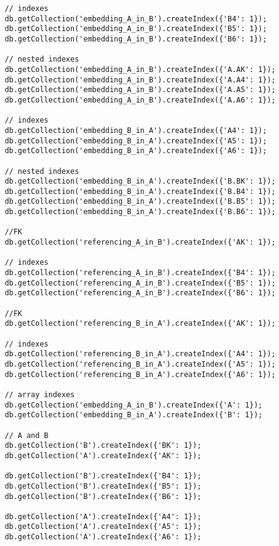 \begin{verbatim}
    // indexes
    db.getCollection('embedding_A_in_B').createIndex({'B4': 1});
    db.getCollection('embedding_A_in_B').createIndex({'B5': 1});
    db.getCollection('embedding_A_in_B').createIndex({'B6': 1});

    // nested indexes
    db.getCollection('embedding_A_in_B').createIndex({'A.AK': 1});
    db.getCollection('embedding_A_in_B').createIndex({'A.A4': 1});
    db.getCollection('embedding_A_in_B').createIndex({'A.A5': 1});
    db.getCollection('embedding_A_in_B').createIndex({'A.A6': 1});

    // indexes
    db.getCollection('embedding_B_in_A').createIndex({'A4': 1});
    db.getCollection('embedding_B_in_A').createIndex({'A5': 1});
    db.getCollection('embedding_B_in_A').createIndex({'A6': 1});

    // nested indexes
    db.getCollection('embedding_B_in_A').createIndex({'B.BK': 1});
    db.getCollection('embedding_B_in_A').createIndex({'B.B4': 1});
    db.getCollection('embedding_B_in_A').createIndex({'B.B5': 1});
    db.getCollection('embedding_B_in_A').createIndex({'B.B6': 1});

    //FK
    db.getCollection('referencing_A_in_B').createIndex({'AK': 1});               

    // indexes
    db.getCollection('referencing_A_in_B').createIndex({'B4': 1});
    db.getCollection('referencing_A_in_B').createIndex({'B5': 1});
    db.getCollection('referencing_A_in_B').createIndex({'B6': 1});

    //FK
    db.getCollection('referencing_B_in_A').createIndex({'AK': 1});               

    // indexes
    db.getCollection('referencing_B_in_A').createIndex({'A4': 1});
    db.getCollection('referencing_B_in_A').createIndex({'A5': 1});
    db.getCollection('referencing_B_in_A').createIndex({'A6': 1});

    // array indexes
    db.getCollection('embedding_A_in_B').createIndex({'A': 1});
    db.getCollection('embedding_B_in_A').createIndex({'B': 1});

    // A and B
    db.getCollection('B').createIndex({'BK': 1});
    db.getCollection('A').createIndex({'AK': 1});
    
    db.getCollection('B').createIndex({'B4': 1});
    db.getCollection('B').createIndex({'B5': 1});
    db.getCollection('B').createIndex({'B6': 1});
    
    db.getCollection('A').createIndex({'A4': 1});
    db.getCollection('A').createIndex({'A5': 1});
    db.getCollection('A').createIndex({'A6': 1});
\end{verbatim}

